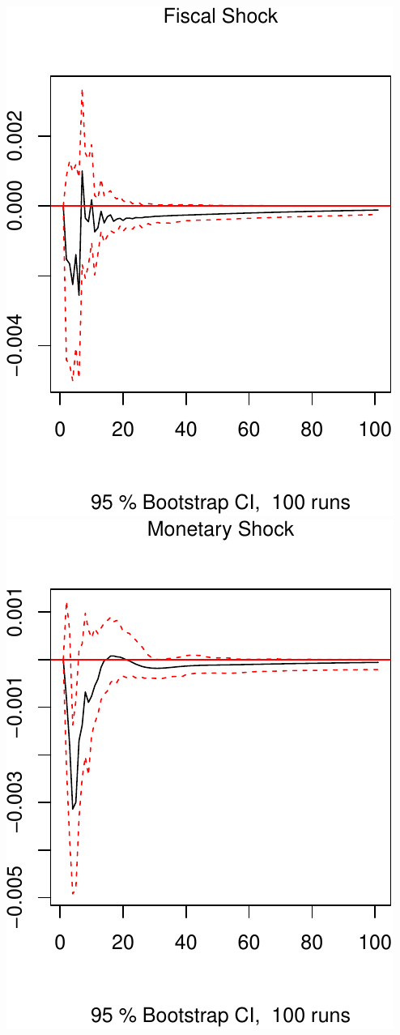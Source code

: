 \documentclass[11pt,preprint, authoryear]{elsarticle}
\numberwithin{equation}{section}
\numberwithin{figure}{section}
\numberwithin{table}{section}
\begin{document}
\includegraphics{TS_proj_files/figure-latex/unnamed-chunk-30-2.pdf}
\includegraphics{TS_proj_files/figure-latex/unnamed-chunk-30-3.pdf}
\end{document}

